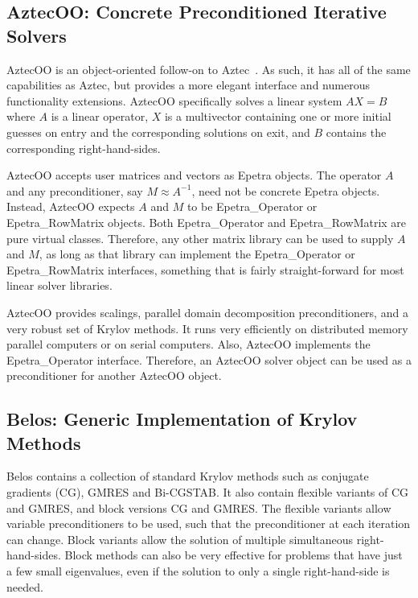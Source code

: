 \documentclass[12pt,relax]{TrilinosOverview}
\begin{document}
\subsection{AztecOO: Concrete Preconditioned Iterative Solvers}

AztecOO is an object-oriented follow-on to Aztec~\cite{Aztec2.1}.  
As such, it has all of the same capabilities as Aztec, but provides 
a more elegant interface and numerous functionality extensions.  
AztecOO specifically solves a linear system $AX=B$ where $A$ is a 
linear operator, $X$ is a multivector containing one or more initial 
guesses on entry and the corresponding solutions on exit, and $B$ 
contains the corresponding right-hand-sides.

AztecOO accepts user matrices and vectors as Epetra objects.  The 
operator $A$ and any preconditioner, say $M \approx A^{-1}$, need 
not be concrete Epetra objects.  Instead, AztecOO expects $A$ and 
$M$ to be Epetra\_Operator or Epetra\_RowMatrix objects.  Both 
Epetra\_Operator and Epetra\_RowMatrix are pure virtual classes.  
Therefore, any other matrix library can be used to supply $A$ 
and $M$, as long as that library can implement the  Epetra\_Operator 
or Epetra\_RowMatrix interfaces, something that is fairly 
straight-forward for most linear solver libraries.

AztecOO provides scalings, parallel domain decomposition 
preconditioners, and a very robust set of Krylov methods.  It runs 
very efficiently on distributed memory parallel computers or on 
serial computers.  Also, AztecOO implements the Epetra\_Operator 
interface.  Therefore, an AztecOO solver object can be used as a 
preconditioner for another AztecOO object.

\subsection{Belos: Generic Implementation of Krylov Methods}

Belos contains a collection of standard Krylov methods such as
conjugate gradients (CG), GMRES and Bi-CGSTAB.  It also contain flexible
variants of CG and GMRES, and block versions CG and GMRES.  The
flexible variants allow variable preconditioners to be used, such that
the preconditioner at each iteration can change.  Block variants allow
the solution of multiple simultaneous right-hand-sides.  Block methods
can also be very effective for problems that have just a few small
eigenvalues, even if the solution to only a single right-hand-side is
needed.
\end{document}
